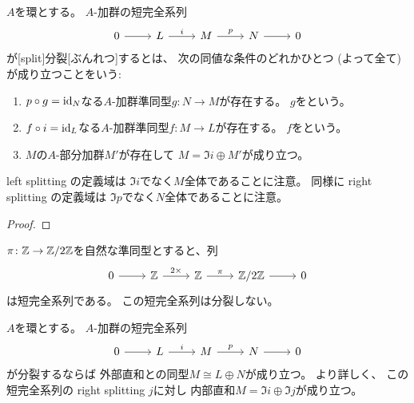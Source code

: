 \documentclass[report]{jlreq}
\begin{document}
\begin{definition}[分裂]
    $A$を環とする。
    $A$-加群の短完全系列
    \begin{equation}
        \begin{tikzcd}
            0 \ar{r}
                & L \ar{r}{i}
                & M \ar{r}{p}
                & N \ar{r}
                & 0
        \end{tikzcd}
    \end{equation}
    が[split]{分裂}[ぶんれつ]するとは、
    次の同値な条件のどれかひとつ (よって全て) が成り立つことをいう:
    \begin{enumerate}
        \item $p \circ g = \mathrm{id}_N$なる$A$-加群準同型$g \colon N \to M$が存在する。
            $g$をという。
        \item $f \circ i = \mathrm{id}_L$なる$A$-加群準同型$f \colon M \to L$が存在する。
            $f$をという。
        \item $M$の$A$-部分加群$M'$が存在して
            $M = \Im i \oplus M'$が成り立つ。
    \end{enumerate}
\end{definition}

\begin{remark}
    left splitting の定義域は
    $\Im i$でなく$M$全体であることに注意。
    同様に right splitting の定義域は
    $\Im p$でなく$N$全体であることに注意。
\end{remark}

\begin{proof}
    \TODO{}
\end{proof}

\begin{example}[分裂しない短完全系列の例]
    $\pi \colon \mathbb{Z} \to \mathbb{Z}/2\mathbb{Z}$を自然な準同型とすると、列
    \begin{equation}
        \begin{tikzcd}
            0 \ar{r}
                & \Z \ar{r}{2 \times}
                & \Z \ar{r}{\pi}
                & \Z/2\Z \ar{r}
                & 0
        \end{tikzcd}
    \end{equation}
    は短完全系列である。
    この短完全系列は分裂しない。
\end{example}

\begin{proposition}[分裂すれば直和で書ける]
    $A$を環とする。
    $A$-加群の短完全系列
    \begin{equation}
        \begin{tikzcd}
            0 \ar{r}
                & L \ar{r}{i}
                & M \ar{r}{p}
                & N \ar{r}
                & 0
        \end{tikzcd}
    \end{equation}
    が分裂するならば
    外部直和との同型$M \cong L \oplus N$が成り立つ。
    より詳しく、
    この短完全系列の right splitting $j$に対し
    内部直和$M = \Im i \oplus \Im j$が成り立つ。
\end{proposition}
\end{document}
